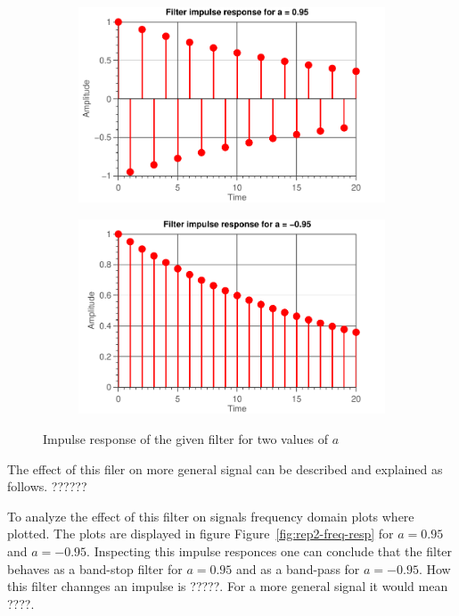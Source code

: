 \documentclass[11pt,titlepage]{report}
\begin{document}
\begin{figure}[H]
	\centering
	\begin{subfigure}{0.49\textwidth}
		\includegraphics[width=\textwidth]{../../deliverable-7-resources/figures/ass-1/report-2/ass-1-report-2-a-positive.pdf}
	\end{subfigure}
	\begin{subfigure}{0.49\textwidth}
		\includegraphics[width=\textwidth]{../../deliverable-7-resources/figures/ass-1/report-2/ass-1-report-2-a-negative.pdf}
	\end{subfigure}
	\caption{Impulse response of the given filter for two values of $a$}
	\label{fig:rep2-time-resp}
\end{figure}

The effect of this filer on more general signal can be described and explained as follows. ?????? 

To analyze the effect of this filter on signals frequency domain plots where plotted. The plots are displayed in figure Figure~\ref{fig:rep2-freq-resp} for $a=0.95$ and $a=-0.95$. Inspecting this impulse responces one can conclude that the filter behaves as a band-stop filter for $a=0.95$ and as a band-pass for $a=-0.95$. How this filter channges an impulse is ?????. For a more general signal it would mean ????. \\
\end{document}
